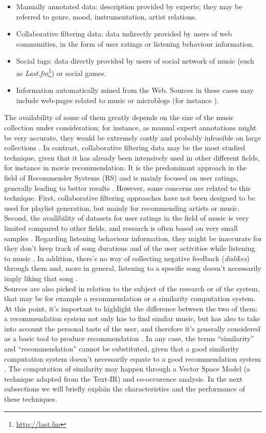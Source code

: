 \begin{itemize}
\item Manually annotated data: description provided by experts; they may be referred to genre, mood, instrumentation, artist relations.
\item Collaborative filtering data: data indirectly provided by users of web communities, in the form of user ratings or listening behaviour information.
\item Social tags: data directly provided by users of social network of music (such as \textit{Last.fm}\footnote{\url{http://last.fm}}) or social games.
\item Information automatically mined from the Web. Sources in these cases may include web-pages related to music or microblogs (for instance ).
\end{itemize}
 The availability of some of them greatly depends on the size of the music collection under consideration; for instance, as manual expert annotations might be very accurate, they would be extremely costly and probably infeasible on large collections \cite{Szyma09}. In contrast, collaborative filtering data may be the most studied technique, given that it has already been intensively used in other different fields, for instance in movie recommendation. It is the predominant approach in the field of Recommender Systems (RS) \cite{jannach12} and is mainly focused on user ratings, generally leading to better results \cite{green09}. However, some concerns are related to this technique. First, collaborative filtering approaches have not been designed to be used for playlist generation, but mainly for recommending artists or music. Second, the availibility of datasets for user ratings in the field of music is very limited compared to other fields, and research is often based on very small samples \cite{liu09}. Regarding listening behaviour information, they might be inaccurate for they don't keep track of song durations and of the user activities while listening to music \cite{jawaheer10}. In addition, there's no way of collecting negative feedback (\textit{dislikes}) through them and, more in general, listening to a specific song doesn't necessarily imply liking that song \cite{bogdanov13}. \\Sources are also picked in relation to the subject of the research or of the system, that may be for example a recommendation or a similarity computation system. At this point, it's important to highlight the difference between the two of them: a recommendation system not only has to find similar music, but has also to take into account the personal taste of the user, and therefore it's generally considered as a basic tool to produce recommendation \cite{celma08}. In any case, the terms ``similarity'' and ``recommendation'' cannot be substituted, given that a good similarity computation system doesn't necessarily equate to a good recommendation system \cite{mcnee06}. 
 The computation of similarity may happen through a Vector Space Model (a technique adapted from the Text-IR) and co-occurence analysis. In the next subsections we will briefly explain the characteristics and the performance of these techniques.

